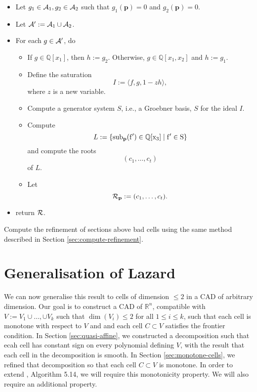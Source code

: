 \documentclass[
]{book}
\theoremstyle{definition}
\theoremstyle{definition}
\theoremstyle{definition}
\theoremstyle{definition}
\theoremstyle{remark}
\begin{document}
\begin{itemize}
\item
  Let \(g_1 \in {\cal A}_1, g_2 \in {\cal A}_2\) such that \(g_1(\mathbf{p}) = 0\) and \(g_2(\mathbf{p}) = 0\).
\item
  Let \({\cal A'} := {\cal A}_1 \cup {\cal A}_2\).
\item
  For each \(g \in {\cal A'}\), do

  \begin{itemize}
  \item
    If \(g \in \mathbb{Q}[x_1]\), then \(h := g_2\). Otherwise, \(g \in \mathbb{Q}[x_1,x_2]\) and \(h := g_1\).
  \item
    Define the saturation
    \[
    I := \langle f, g, 1 - z h \rangle,
    \]
    where \(z\) is a new variable.
  \item
    Compute a generator system \(S\), i.e., a Groebner basis, \(S\) for the ideal \(I\).
  \item
    Compute
    \[
    L := \{ \rm{sub}_{\mathbf{p}}(f') \in \mathbb{Q}[x_3] \mid f' \in S \}
    \]
    and compute the roots
    \[
    (c_1,\ldots,c_t)
    \]
    of \(L\).
  \item
    Let
    \[
    {\cal R}_{\mathbf{p}} := (c_1,\ldots,c_t).
    \]
  \end{itemize}
\item
  return \(\cal R\).
\end{itemize}

Compute the refinement of sections above bad cells using the same method described in Section \ref{sec:compute-refinement}.

\hypertarget{generalisation-of-lazard}{%
\section{Generalisation of Lazard}\label{generalisation-of-lazard}}

We can now generalise this result to cells of dimension \(\le 2\) in a CAD of arbitrary dimension.
Our goal is to construct a CAD of \(\mathbb{R}^n\), compatible with \(V := V_1 \cup \ldots, \cup V_k\) such that \(\dim(V_i) \le 2\) for all \(1 \le i \le k\), such that each cell is monotone with respect to \(V\) and and each cell \(C \subset V\) satisfies the frontier condition.
In Section \ref{sec:quasi-affine}, we constructed a decomposition such that ecah cell has constant sign on every polynomial defining \(V\), with the result that each cell in the decomposition is smooth. In Section \ref{sec:monotone-cells}, we refined that decomposition so that each cell \(C \subset V\) is monotone.
In order to extend \citet{lazard10}, Algorithm 5.14, we will require this monotonicity property. We will also require an additional property.
\end{document}
